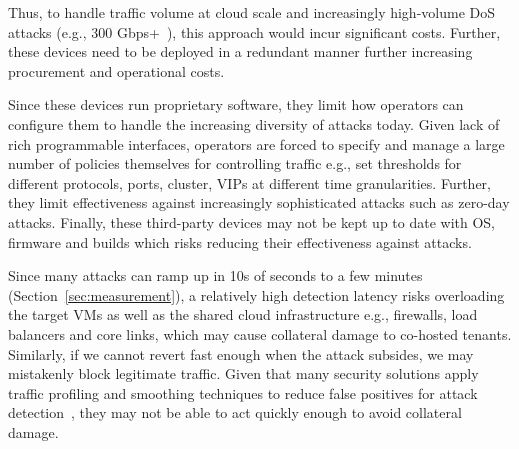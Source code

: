 Thus, to handle
traffic volume at cloud scale and increasingly high-volume DoS attacks 
(e.g., 300 Gbps+~\cite{Q4report}), this approach would incur significant costs. Further, these devices
need to be deployed in a redundant manner further increasing procurement and 
operational costs. 

 Since these devices run proprietary software, they limit
how operators can configure them to handle the increasing diversity of attacks today. 
Given lack of rich programmable interfaces, 
operators are forced to specify and manage a large number of policies themselves  
for controlling traffic e.g., set thresholds for different protocols, ports, cluster, VIPs 
at different time granularities. Further, 
they limit effectiveness against increasingly 
sophisticated attacks such as zero-day attacks. %
Finally, these third-party devices may not be kept up to date with OS, firmware and builds which risks reducing their effectiveness against attacks. 

 Since many attacks can ramp up
in 10s of seconds to a few minutes (Section~\ref{sec:measurement}), a
relatively high detection latency risks overloading the target VMs as
well as the shared cloud infrastructure e.g., firewalls, load
balancers and core links, which may cause collateral damage to
co-hosted tenants.  Similarly, if we cannot revert fast
enough when the attack subsides, we may mistakenly block legitimate
traffic. Given that many security solutions apply traffic
profiling and smoothing techniques to reduce false positives for
attack detection~\cite{peakflow}, they may not be able to act quickly
enough to avoid collateral damage.


%

